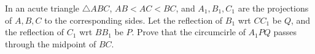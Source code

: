 In an acute triangle $\bigtriangleup ABC$, $AB<AC<BC$, and $A_1,B_1,C_1$ are the projections of $A,B,C$ to the corresponding sides. Let the reflection of $B_1$ wrt $CC_1$ be $Q$, and the reflection of $C_1$ wrt $BB_1$ be $P$.
Prove that the circumcirle of $A_1PQ$ passes through the midpoint of $BC$.
